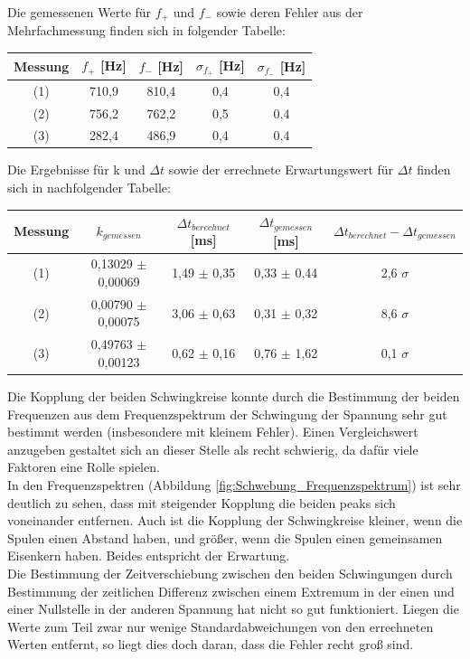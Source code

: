 \documentclass[12pt,a4paper]{article}
\begin{document}
Die gemessenen Werte für $f_+$ und $f_-$ sowie deren Fehler aus der Mehrfachmessung finden sich in folgender Tabelle: \\

\begin{center}
\begin{tabular}{|c|c|c|c|c|}
\hline 
Messung & $f_+$ [Hz] & $f_-$ [Hz] & $\sigma _{f_+}$ [Hz] & $\sigma _{f_-}$ [Hz] \\ 
\hline 
(1) & 710,9 & 810,4 & 0,4 & 0,4 \\ 
\hline 
(2) & 756,2 & 762,2 & 0,5 & 0,4 \\ 
\hline 
(3) & 282,4 & 486,9 & 0,4 & 0,4 \\ 
\hline 
\end{tabular} 
\end{center} 

Die Ergebnisse für k und $\Delta t$ sowie der errechnete Erwartungswert für $\Delta t$ finden sich in nachfolgender Tabelle: \\

\begin{center}
\begin{tabular}{|c|c|c|c|c|}
\hline 
Messung & $k_{gemessen}$ & $\Delta t_{berechnet}$ [ms] & $\Delta t_{gemessen}$ [ms] & $\Delta t_{berechnet} - \Delta t_{gemessen}$  \\ 
\hline 
(1) & 0,13029 $\pm$ 0,00069 & 1,49 $\pm$ 0,35 & 0,33 $\pm$ 0,44 & 2,6 $\sigma$ \\ 
\hline 
(2) & 0,00790 $\pm$ 0,00075 & 3,06 $\pm$ 0,63 & 0,31 $\pm$ 0,32 & 8,6 $\sigma$ \\ 
\hline 
(3) & 0,49763 $\pm$ 0,00123 & 0,62 $\pm$ 0,16 & 0,76 $\pm$ 1,62 & 0,1 $\sigma$ \\ 
\hline 
\end{tabular} 
\end{center}

Die Kopplung der beiden Schwingkreise konnte durch die Bestimmung der beiden Frequenzen aus dem Frequenzspektrum der Schwingung der Spannung sehr gut bestimmt werden (insbesondere mit kleinem Fehler). Einen Vergleichswert anzugeben gestaltet sich an dieser Stelle als recht schwierig, da dafür viele Faktoren eine Rolle spielen.  \\
In den Frequenzspektren (Abbildung \ref{fig:Schwebung_Frequenzspektrum}) ist sehr deutlich zu sehen, dass mit steigender Kopplung die beiden peaks sich voneinander entfernen. Auch ist die Kopplung der Schwingkreise kleiner, wenn die Spulen einen Abstand haben, und größer, wenn die Spulen einen gemeinsamen Eisenkern haben. Beides entspricht der Erwartung. \\
Die Bestimmung der Zeitverschiebung zwischen den beiden Schwingungen durch Bestimmung der zeitlichen Differenz zwischen einem Extremum in der einen und einer Nullstelle in der anderen Spannung hat nicht so gut funktioniert. Liegen die Werte zum Teil zwar nur wenige Standardabweichungen von den errechneten Werten entfernt, so liegt dies doch daran, dass die Fehler recht groß sind.
\end{document}
